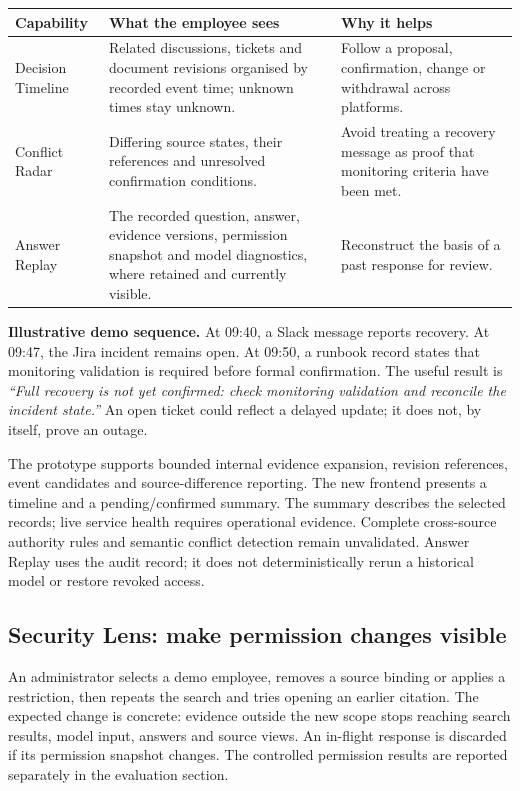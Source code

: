 \documentclass[10pt,a4paper]{article}
\begin{document}
\begin{tabularx}{\linewidth}{@{}>{\raggedright\arraybackslash}p{34mm}YY@{}}
\toprule
\textbf{Capability} & \textbf{What the employee sees} & \textbf{Why it helps} \\
\midrule
Decision Timeline & Related discussions, tickets and document revisions organised by recorded event time; unknown times stay unknown. & Follow a proposal, confirmation, change or withdrawal across platforms. \\
Conflict Radar & Differing source states, their references and unresolved confirmation conditions. & Avoid treating a recovery message as proof that monitoring criteria have been met. \\
Answer Replay & The recorded question, answer, evidence versions, permission snapshot and model diagnostics, where retained and currently visible. & Reconstruct the basis of a past response for review. \\
\bottomrule
\end{tabularx}

\begin{noteBox}
\textbf{Illustrative demo sequence.} At 09:40, a Slack message reports recovery. At 09:47, the Jira incident remains open. At 09:50, a runbook record states that monitoring validation is required before formal confirmation. The useful result is \emph{``Full recovery is not yet confirmed: check monitoring validation and reconcile the incident state.''} An open ticket could reflect a delayed update; it does not, by itself, prove an outage.
\end{noteBox}

The prototype supports bounded internal evidence expansion, revision references, event candidates and source-difference reporting. The new frontend presents a timeline and a pending/confirmed summary. The summary describes the selected records; live service health requires operational evidence. Complete cross-source authority rules and semantic conflict detection remain unvalidated. Answer Replay uses the audit record; it does not deterministically rerun a historical model or restore revoked access.

\subsection{Security Lens: make permission changes visible}
An administrator selects a demo employee, removes a source binding or applies a restriction, then repeats the search and tries opening an earlier citation. The expected change is concrete: evidence outside the new scope stops reaching search results, model input, answers and source views. An in-flight response is discarded if its permission snapshot changes. The controlled permission results are reported separately in the evaluation section.
\end{document}
